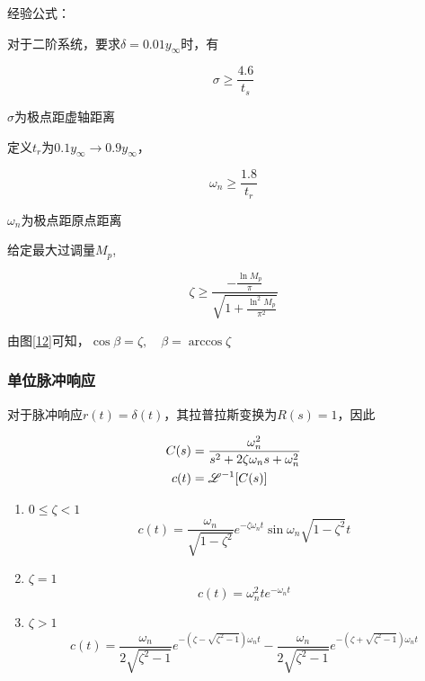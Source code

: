 经验公式：

对于二阶系统，要求$\delta=0.01y_\infty$时，有

\begin{equation*}
	\sigma\geq\frac{4.6}{t_s}
\end{equation*}

$\sigma$为极点距虚轴距离

定义$t_r$为$0.1y_\infty\rightarrow0.9y_\infty$，

\begin{equation*}
	\omega_n\geq\frac{1.8}{t_r}
\end{equation*}

$\omega_n$为极点距原点距离

给定最大过调量$M_p$,

\begin{equation*}
	\zeta\geq\frac{-\frac{\ln M_p}{\pi}}{\sqrt{1+\frac{\ln^2M_p}{\pi^2}}}
\end{equation*}

由图\ref{12}可知，$\cos\beta=\zeta,\quad\beta=\arccos\zeta$

\subsubsection{单位脉冲响应}

对于脉冲响应$r(t)=\delta(t)$，其拉普拉斯变换为$R(s)=1$，因此

\begin{align*}
C(s)&=\frac{\omega_n^2}{s^2+2\zeta\omega_ns+\omega_n^2}\\
c(t)&=\mathscr{L}^{-1}[C(s)]
\end{align*}

\begin{enumerate}
	\item	$0\le\zeta<1$
	\begin{equation*}
	c(t)=\frac{\omega_n}{\sqrt{1-\zeta^2}}e^{-\zeta\omega_nt}\sin\omega_n\sqrt{1-\zeta^2}t
	\end{equation*}
	
	\item	$\zeta=1$
	\begin{equation*}
	c(t)=\omega_n^2te^{-\omega_nt}
	\end{equation*}

	\item	$\zeta>1$
	\begin{equation*}
	c(t)=\frac{\omega_n}{2\sqrt{\zeta^2-1}}e^{-(\zeta-\sqrt{\zeta^2-1})\omega_nt}-\frac{\omega_n}{2\sqrt{\zeta^2-1}}e^{-(\zeta+\sqrt{\zeta^2-1})\omega_nt}
	\end{equation*}
\end{enumerate}

